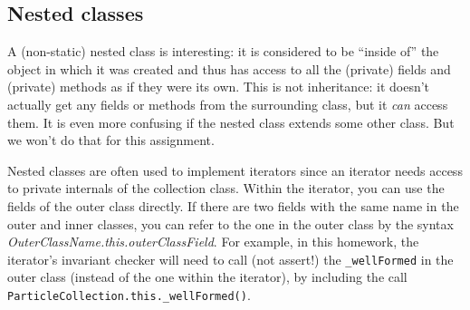 \subsection{Nested classes}

A (non-static)
nested class is interesting: it is considered to be ``inside of'' the
object in which it was created and thus has access to all the
(private) fields and (private) methods as if they were its own.
This is not inheritance: it doesn't actually get any fields or methods
from the surrounding class, but it \emph{can} access them.
It is even more confusing if the nested class extends some other
class.  But we won't do that for this assignment.

Nested classes are often used to implement iterators since an iterator
needs access to private internals of the collection class.
Within the iterator, you can use the fields of the outer class directly.
If there are two fields with the same name in the outer and inner classes,
you can refer to the one in the outer class by the syntax 
\emph{OuterClassName.this.outerClassField}.
For example, in this homework, the iterator's invariant checker will
need to call (not assert!) the \verb|_wellFormed| in the outer class
(instead of the one within the iterator), by including the call
\verb|ParticleCollection.this._wellFormed()|.

%

